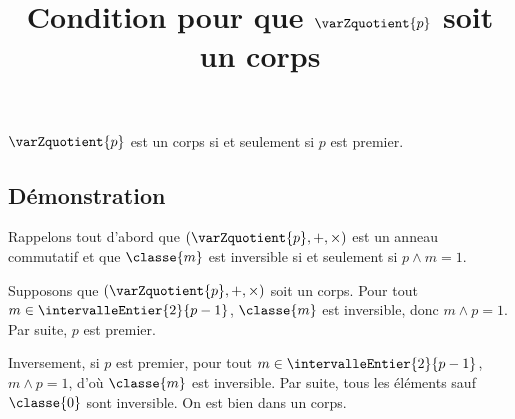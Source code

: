 \documentclass[fontsize=12pt,twoside=false,parskip=half]{scrartcl}
\title{Condition pour que $\varZquotient{p}$ soit un corps}
\date{}
\author{}
\begin{document}
\maketitle
   \begin{Theoreme}
      $\varZquotient{p}$ est un corps si et seulement si $p$ est premier.
   \end{Theoreme}
   \subsection{Démonstration}
      Rappelons tout d’abord que $(\varZquotient{p}, +, \times)$ est un anneau 
      commutatif et que $\classe{m}$ est inversible si et seulement si 
      $p \wedge m = 1$. 

      Supposons que $(\varZquotient{p}, +, \times)$ soit un corps. Pour tout 
      $m \in \intervalleEntier{2}{p - 1}$, $\classe{m}$ est inversible, donc 
      $m \wedge p = 1$. Par suite, $p$ est premier.
      
      Inversement, si $p$ est premier, pour tout $m \in \intervalleEntier{2}{p - 1}$,
      $m \wedge p = 1$, d’où $\classe{m}$ est inversible. Par suite, tous les 
      éléments sauf $\classe{0}$ sont inversible. On est bien dans un corps.
      
\end{document}
